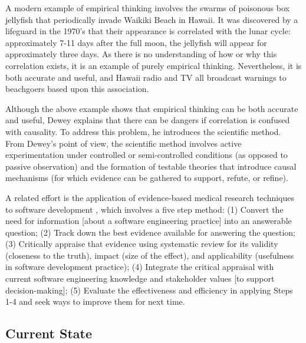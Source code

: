 A modern example of empirical thinking involves the swarms of poisonous box
jellyfish that periodically invade Waikiki Beach in Hawaii.  It was
discovered by a lifeguard in the 1970's that their appearance is correlated
with the lunar cycle: approximately 7-11 days after the full moon, the
jellyfish will appear for approximately three days.  As there is no
understanding of how or why this correlation exists, it is an example of
purely empirical thinking.  Nevertheless, it is both accurate and useful,
and Hawaii radio and TV all broadcast warnings to beachgoers based upon
this association.

Although the above example shows that empirical thinking can be
both accurate and useful, Dewey explains that there can be dangers if
correlation is confused with causality. To address this problem, he
introduces the scientific method.  From Dewey's point of view, the
scientific method involves active experimentation under controlled or
semi-controlled conditions (as opposed to passive observation) and the
formation of testable theories that introduce causal mechanisms (for which
evidence can be gathered to support, refute, or refine).  

A related effort is the application of evidence-based medical research
techniques to software development \citep{Kitchenham04,Kitchenham04a},
which involves a five step method: (1) Convert the need for information
[about a software engineering practice] into an answerable question; (2)
Track down the best evidence available for answering the question; (3)
Critically appraise that evidence using systematic review for its validity
(closeness to the truth), impact (size of the effect), and applicability
(usefulness in software development practice); (4) Integrate the critical
appraisal with current software engineering knowledge and stakeholder
values [to support decision-making]; (5) Evaluate the effectiveness and
efficiency in applying Steps 1-4 and seek ways to improve them for next
time.  


\subsection{Current State}
\label{sec:current-state}


